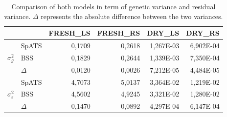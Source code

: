 \begin{table}[htbp]
  \centering
  \caption[Comparison of both models in term of genetic variance and residual variance]{Comparison of both models in term of genetic variance and residual variance. $\Delta$ represents the absolute difference between the two variances. }
    \begin{tabular}{clrrrr}
    \toprule
          &       & \multicolumn{1}{l}{FRESH\_LS} & \multicolumn{1}{l}{FRESH\_RS} & \multicolumn{1}{l}{DRY\_LS} & \multicolumn{1}{l}{DRY\_RS} \\
    \midrule
    \multirow{3}[2]{*}{$\sigma^2_{g}$} & SpATS & 0,1709 & 0,2618 & 1,267E-03 & 6,902E-04 \\
          & BSS   & 0,1829 & 0,2644 & 1,339E-03 & 7,350E-04 \\
          & $\Delta$ & 0,0120 & 0,0026 & 7,212E-05 & 4,484E-05 \\
    \midrule
    \multirow{3}[2]{*}{$\sigma^2_{\varepsilon}$} & SpATS & 4,7073 & 5,0137 & 3,364E-02 & 1,219E-02 \\
          & BSS   & 4,5602 & 4,9245 & 3,321E-02 & 1,280E-02 \\
          & $\Delta$ & 0,1470 & 0,0892 & 4,297E-04 & 6,147E-04 \\
    \bottomrule
    \end{tabular}%

  \label{tab:sigma_model_comparison}%
\end{table}%

